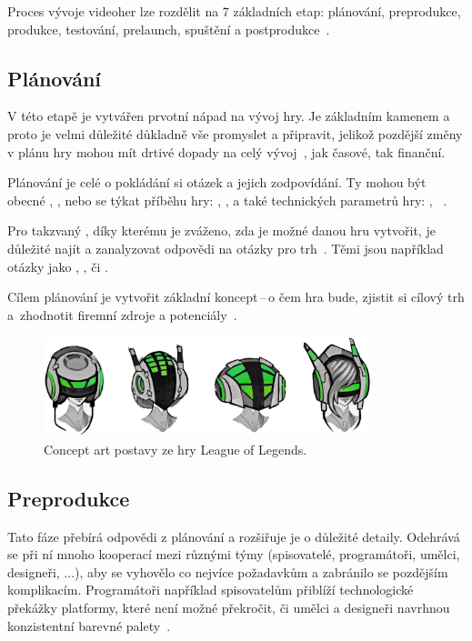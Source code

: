 Proces vývoje videoher lze rozdělit na 7 základních etap: plánování, preprodukce, produkce, testování, prelaunch, spuštění a postprodukce~\cite{g2_game_development}.
\subsection*{Plánování}
V této etapě je vytvářen prvotní nápad na vývoj hry. Je základním kamenem a proto je velmi důležité důkladně vše promyslet a připravit, jelikož pozdější změny v plánu hry mohou mít drtivé dopady na celý vývoj~\cite{GameMaker_development}, jak časové, tak finanční. 

Plánování je celé o pokládání si otázek a jejich zodpovídání. Ty mohou být obecné , , nebo se týkat příběhu hry: , ,  a také technických parametrů hry: , ~\cite{g2_game_development}.

Pro takzvaný , díky kterému je zváženo, zda je možné danou hru vytvořit, je důležité najít a zanalyzovat odpovědi na otázky pro trh~\cite{GameMaker_development}. Těmi jsou například otázky jako , ,  či .

Cílem plánování je vytvořit základní koncept\,--\,o čem hra bude, zjistit si cílový trh a~zhodnotit firemní zdroje a potenciály~\cite{novak2011game}.

\begin{figure}[hb]
    \centering
	\includegraphics[width=0.85\textwidth]{obrazky-figures/ch2/concept_art.png}
	\caption{Concept art postavy ze hry League of Legends.~\cite{artLOLvol1}}
	\label{fig:concept_art_lol}
\end{figure}

\subsection*{Preprodukce}
Tato fáze přebírá odpovědi z plánování a rozšiřuje je o důležité detaily. Odehrává se při ní mnoho kooperací mezi různými týmy (spisovatelé, programátoři, umělci, designeři, ...), aby se vyhovělo co nejvíce požadavkům a zabránilo se pozdějším komplikacím. Programátoři například spisovatelům přiblíží technologické překážky platformy, které není možné překročit, či umělci a designeři navrhnou konzistentní barevné palety~\cite{g2_game_development}.

